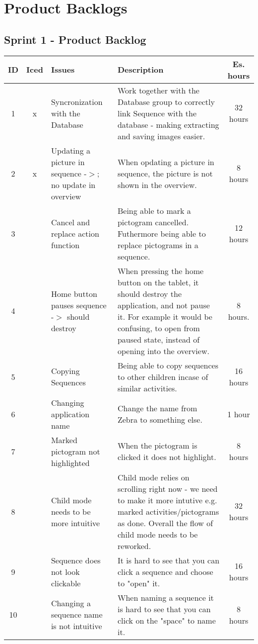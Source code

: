 \chapter{Product Backlogs}\label{app:productbacklog}
\section{Sprint 1 - Product Backlog}
\begin{longtable} { | c | c | p{5cm} | p{5cm} | c | } 
\hline
	ID 	&	Iced	&	Issues	&	Description		&	 Es. hours \\\hline
	1	& 	x	&	Syncronization with the Database		& 	Work together with the Database group to correctly link Sequence with the database - making extracting and saving images easier.	&	32 hours	\\\hline
	2	& 	x	&	Updating a picture in sequence -$>$; no update in overview	&	When opdating a picture in sequence, the picture is not shown in the overview.	&	8 hours	\\\hline
	3	& 		&	Cancel and replace action function	&	Being able to mark a pictogram cancelled. Futhermore being able to replace pictograms in a sequence.	&	12 hours \\\hline
	4	& 		&	Home button pauses sequence -$>$ should destroy	 &	When pressing the home button on the tablet, it should destroy the application, and not pause it. For example it would be confusing, to open from paused state, instead of opening into the overview.	&	8 hours.	\\\hline
	5	& 		&	Copying Sequences	&	Being able to copy sequences to other children incase of similar activities.	&	16 hours \\\hline
	6	& 		&	Changing application name	&	Change the name from Zebra to something else.	&	1 hour	\\\hline
	7	& 		&	Marked pictogram not highlighted		&	When the pictogram is clicked it does not highlight.	&	8 hours 	\\\hline
	8	& 		&	Child mode needs to be more intuitive		&	Child mode relies on scrolling right now - we need to make it more intutive e.g. marked activities/pictograms as done. Overall the flow of child mode needs to be reworked.	&	32 hours	\\\hline
	9	& 		&	Sequence does not look clickable		&	It is hard to see that you can click a sequence and choose to "open" it.	&	16 hours	\\\hline
	10	& 		&	Changing a sequence name is not intuitive	&	When naming a sequence it is hard to see that you can click on the "space" to name it.	&	8 hours	\\\hline

\end{longtable}
